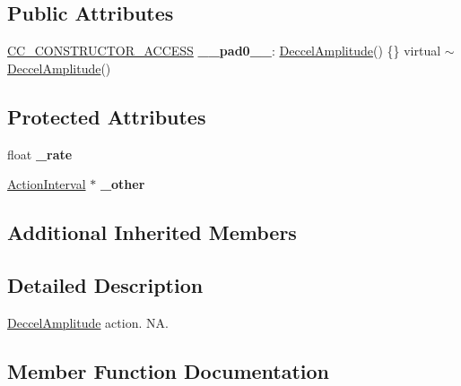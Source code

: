\subsection*{Public Attributes}
\begin{DoxyCompactItemize}
\item 
\mbox{\label{classDeccelAmplitude_a882980afc6a8ad842c947bf6f4bdad77}} 
\hyperlink{_2cocos2d_2cocos_2base_2ccConfig_8h_a25ef1314f97c35a2ed3d029b0ead6da0}{C\+C\+\_\+\+C\+O\+N\+S\+T\+R\+U\+C\+T\+O\+R\+\_\+\+A\+C\+C\+E\+SS} {\bfseries \+\_\+\+\_\+pad0\+\_\+\+\_\+}\+: \hyperlink{classDeccelAmplitude}{Deccel\+Amplitude}() \{\} virtual $\sim$\hyperlink{classDeccelAmplitude}{Deccel\+Amplitude}()
\end{DoxyCompactItemize}
\subsection*{Protected Attributes}
\begin{DoxyCompactItemize}
\item 
\mbox{\label{classDeccelAmplitude_af2906fc8ad3a7e4f202d6231cb8cee20}} 
float {\bfseries \+\_\+rate}
\item 
\mbox{\label{classDeccelAmplitude_a31f03aa4a12ce75b7c8ca2a8ef9385bd}} 
\hyperlink{classActionInterval}{Action\+Interval} $\ast$ {\bfseries \+\_\+other}
\end{DoxyCompactItemize}
\subsection*{Additional Inherited Members}


\subsection{Detailed Description}
\hyperlink{classDeccelAmplitude}{Deccel\+Amplitude} action.  NA. 

\subsection{Member Function Documentation}
\mbox{\label{classDeccelAmplitude_a74b49064db52ceacf01ff30369251ef3}} 
